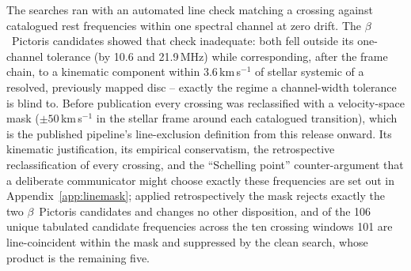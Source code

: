 \documentclass{openjournal}
\begin{document}
The searches ran with an automated line check matching a crossing
against catalogued rest frequencies within one spectral channel at
zero drift. The $\beta$~Pictoris candidates showed that check
inadequate: both fell outside its one-channel tolerance (by 10.6 and
21.9\,MHz) while corresponding, after the frame chain, to a kinematic
component within 3.6\,km\,s$^{-1}$ of stellar systemic of a resolved,
previously mapped disc -- exactly the regime a channel-width tolerance
is blind to. Before publication every crossing was reclassified with a
velocity-space mask ($\pm50$\,km\,s$^{-1}$ in the stellar frame around
each catalogued transition), which is the published pipeline's
line-exclusion definition from this release onward. Its kinematic
justification, its empirical conservatism, the retrospective
reclassification of every crossing, and the ``Schelling point''
counter-argument that a deliberate communicator might choose exactly
these frequencies are set out in Appendix~\ref{app:linemask}; applied
retrospectively the mask rejects exactly the two $\beta$~Pictoris
candidates and changes no other disposition, and of the 106 unique
tabulated candidate frequencies across the ten crossing windows 101
are line-coincident within the mask and suppressed by the clean
search, whose product is the remaining five.
\end{document}
